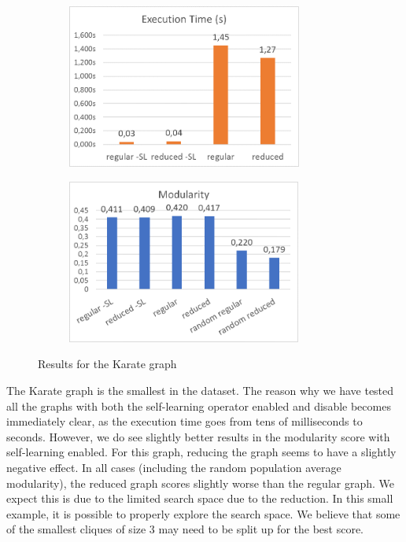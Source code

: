 \begin{figure}[H]
\begin{center}
    \begin{subfigure}{0.47\textwidth}
    \begin{center}
    \includegraphics[height=5.4cm]{images/karatetime.png}
    \end{center}
    \end{subfigure}
    \begin{subfigure}{0.47\textwidth}
    \begin{center}
    \includegraphics[height=5.4cm]{images/karatefitness.png}
    \end{center}
    \end{subfigure}
\caption{Results for the Karate graph}\label{fig:karate}
\end{center}
\end{figure}

The Karate graph is the smallest in the dataset. The reason why we have tested all the graphs with both the self-learning operator enabled and disable becomes immediately clear, as the execution time goes from tens of milliseconds to seconds. However, we do see slightly better results in the modularity score with self-learning enabled. For this graph, reducing the graph seems to have a slightly negative effect. In all cases (including the random population average modularity), the reduced graph scores slightly worse than the regular graph. We expect this is due to the limited search space due to the reduction. In this small example, it is possible to properly explore the search space. We believe that some of the smallest cliques of size 3 may need to be split up for the best score.
